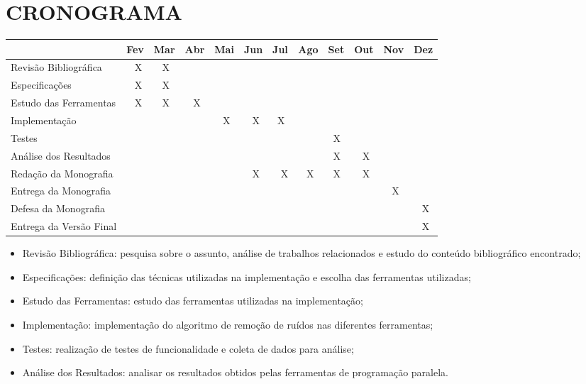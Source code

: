 
\chapter{CRONOGRAMA}
\label{chap:cronograma}

\begin{table}[H]
\centering
\begin{tabular}{|l|l|l|l|l|l|l|l|l|l|l|l|} 
\hline
                        & Fev & Mar & Abr & Mai & Jun & Jul & Ago & Set & Out & Nov & Dez  \\ 
\hline
Revisão Bibliográfica   & ~ X & ~ X & ~~  &     &     &     &     &     &     &     &      \\ 
\hline
Especificações          & ~ X & ~ X & ~~  &     &     &     &     &     &     &     &      \\ 
\hline
Estudo das Ferramentas   & ~ X & ~ X & ~ X &     &     &     &     &     &     &     &      \\ 
\hline
Implementação           &     &     &     & ~ X & ~ X & ~X  &     &     &     &     &      \\ 
\hline
Testes                  &     &     &     &     &     &     &     & ~X  & ~~  &     &      \\ 
\hline
Análise dos Resultados  &     &     &     &     &     &     &     & ~X  & ~ X &     &      \\ 
\hline
Redação da Monografia   &     &     &     &     & ~ X & ~ X & ~ X & ~X  & ~ X &     &      \\ 
\hline
Entrega da Monografia   &     &     &     &     &     &     &     &     &     & ~ X &      \\ 
\hline
Defesa da Monografia    &     &     &     &     &     &     &     &     &     &     & ~ X  \\ 
\hline
Entrega da Versão Final &     &     &     &     &     &     &     &     &     &     & ~ X  \\
\hline
\end{tabular}
\end{table}

\begin{itemize}
    \item Revisão Bibliográfica: pesquisa sobre o assunto, análise de trabalhos relacionados e
estudo do conteúdo bibliográfico encontrado;
    \item Especificações: definição das técnicas utilizadas na implementação e escolha das
ferramentas utilizadas;
    \item Estudo das Ferramentas: estudo das ferramentas utilizadas na implementação;
    \item Implementação: implementação do algoritmo de remoção de ruídos nas diferentes
ferramentas;
    \item Testes: realização de testes de funcionalidade e coleta de dados para análise;
    \item Análise dos Resultados: analisar os resultados obtidos pelas ferramentas de
programação paralela.
\end{itemize}
